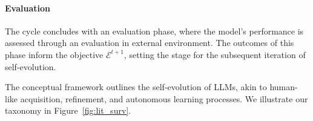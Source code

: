 \documentclass[sn-basic, Numbered]{sn-jnl}%
\def\gE{{\mathcal{E}}}
\theoremstyle{thmstyleone}%
\theoremstyle{thmstyletwo}%
\theoremstyle{thmstylethree}%
\begin{document}
\noindent\paragraph{Evaluation}
The cycle concludes with an evaluation phase, where the model's performance is assessed through an evaluation in external environment. The outcomes of this phase inform the objective $\gE^{t+1}$, setting the stage for the subsequent iteration of self-evolution.

The conceptual framework outlines the self-evolution of LLMs, akin to human-like acquisition, refinement, and autonomous learning processes. We illustrate our taxonomy in Figure~\ref{fig:lit_surv}.
\end{document}
